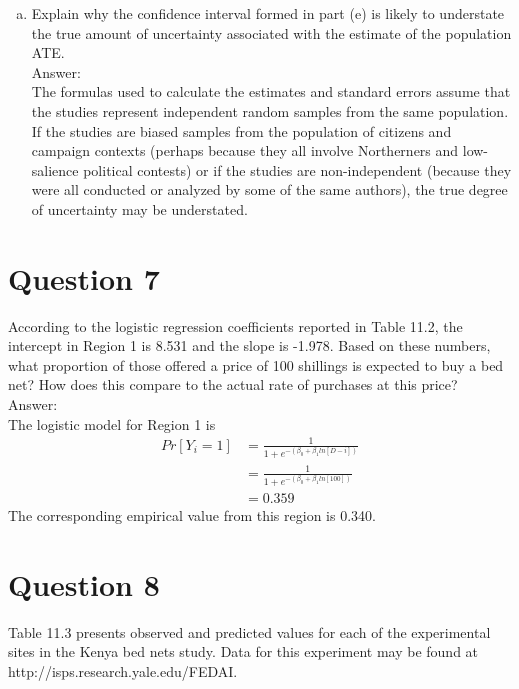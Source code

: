 \documentclass[11pt,notitlepage]{article}\usepackage[]{graphicx}\usepackage[]{color}
\makeatletter
\newenvironment{kframe}{%
 \def\at@end@of@kframe{}%
 \ifinner\ifhmode%
  \def\at@end@of@kframe{\end{minipage}}%
  \begin{minipage}{\columnwidth}%
 \fi\fi%
 \def\FrameCommand##1{\hskip\@totalleftmargin \hskip-\fboxsep
 \colorbox{shadecolor}{##1}\hskip-\fboxsep
     \hskip-\linewidth \hskip-\@totalleftmargin \hskip\columnwidth}%
 \MakeFramed {\advance\hsize-\width
   \@totalleftmargin\z@ \linewidth\hsize
   \@setminipage}}%
 {\par\unskip\endMakeFramed%
 \at@end@of@kframe}
\newenvironment{knitrout}{}{} %
\makeatother
\begin{document}
\begin{enumerate}[a)]
\begin{knitrout}
\begin{kframe}
\begin{Verbatim}[commandchars=\\\{\}]
    \end{Verbatim}
\end{kframe}
\end{knitrout}


\item Explain why the confidence interval formed in part (e) is likely to understate the true amount of uncertainty associated with the estimate of the population ATE.\\
Answer:\\
The formulas used to calculate the estimates and standard errors assume that the studies represent independent random samples from the same population. If the studies are biased samples from the population of citizens and campaign contexts (perhaps because they all involve Northerners and low-salience political contests) or if the studies are non-independent (because they were all conducted or analyzed by some of the same authors), the true degree of uncertainty may be understated.

\end{enumerate}

\section*{Question 7}
According to the logistic regression coefficients reported in Table 11.2, the intercept in Region 1 is 8.531 and the slope is -1.978. Based on these numbers, what proportion of those offered a price of 100 shillings is expected to buy a bed net? How does this compare to the actual rate of purchases at this price?\\
Answer:\\
The logistic model for Region 1 is 
\begin{align*}
Pr[Y_i=1] &= \frac{1}{1+e^{-(\beta_0 + \beta_1 ln[D-i])}}\\
&= \frac{1}{1+e^{-(\beta_0 + \beta_1 ln[100])}}\\
&=0.359
\end{align*}
The corresponding empirical value from this region is 0.340.


\section*{Question 8}
Table 11.3 presents observed and predicted values for each of the experimental sites in the Kenya bed nets study. Data for this experiment may be found at http://isps.research.yale.edu/FEDAI.
\end{document}
